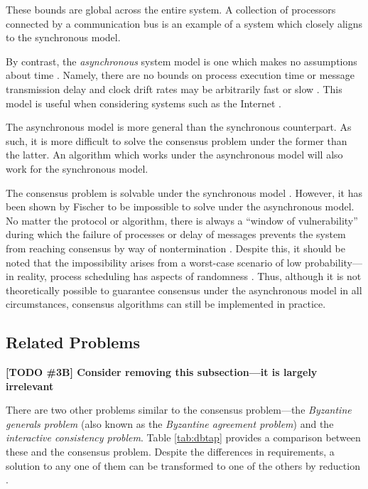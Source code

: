 \documentclass[12pt, a4paper]{article}
\newcommand{\todo}[2]{\textbf{\color{blue}[TODO \##1] #2}\par}
\begin{document}
These bounds are global across the entire system. A collection of processors connected by a communication bus is an example of a system which closely aligns to the synchronous model.

By contrast, the \textit{asynchronous} system model is one which makes no assumptions about time \cite{coulouris2005distributed, hadzilacos1994modular}. Namely, there are no bounds on process execution time or message transmission delay and clock drift rates may be arbitrarily fast or slow \cite{coulouris2005distributed}. This model is useful when considering systems such as the Internet \cite{coulouris2005distributed}.

The asynchronous model is more general than the synchronous counterpart. As such, it is more difficult to solve the consensus problem under the former than the latter. An algorithm which works under the asynchronous model will also work for the synchronous model.

The consensus problem is solvable under the synchronous model \cite{fischer1985impossibility, kshemkalyani_singhal_2008}. However, it has been shown by Fischer \cite{fischer1985impossibility} to be impossible to solve under the asynchronous model. No matter the protocol or algorithm, there is always a ``window of vulnerability'' during which the failure of processes or delay of messages prevents the system from reaching consensus by way of nontermination \cite{fischer1985impossibility}. Despite this, it should be noted that the impossibility arises from a worst-case scenario of low probability---in reality, process scheduling has aspects of randomness \cite{aguilera2010stumbling}. Thus, although it is not theoretically possible to guarantee consensus under the asynchronous model in all circumstances, consensus algorithms can still be implemented in practice.

\subsection{Related Problems} \label{sec:related-problems}

\todo{3B}{Consider removing this subsection---it is largely irrelevant}

There are two other problems similar to the consensus problem---the \textit{Byzantine generals problem} (also known as the \textit{Byzantine agreement problem}) and the \textit{interactive consistency problem}. Table \ref{tab:dbtap} provides a comparison between these and the consensus problem. Despite the differences in requirements, a solution to any one of them can be transformed to one of the others by reduction \cite{fischer1983consensus}.
\end{document}
